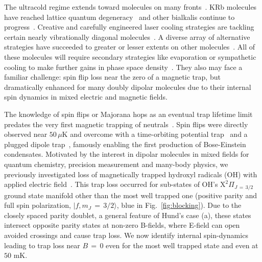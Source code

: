 \documentclass[%
 reprint,
 amsmath,amssymb,
 aps,
prl,
]{revtex4-1}
\begin{document}
The ultracold regime extends toward molecules on many fronts~\cite{Carr2009}. 
KRb molecules have reached lattice quantum degeneracy~\cite{Moses2015} and other bialkalis continue to progress~\cite{Takekoshi2014, Park2015,Guo2016,Liu2017}. 
Creative and carefully engineered laser cooling strategies are tackling certain nearly vibrationally diagonal molecules~\cite{Stuhl2008,Shuman2010,Hummon2013, Barry2014, Zhelyazkova2014, Steinecker2016, Hemmerling2016}. 
A diverse array of alternative strategies have succeeded to greater or lesser extents on other molecules~\cite{Doyle1998, Bethlem1999, Bochinski2003, Narevicius2008, Wiederkehr2012, Prehn2016,Liu2017a}. 
All of these molecules will require secondary strategies like evaporation or sympathetic cooling to make further gains in phase space density~\cite{Parazzoli2011, Stuhl2012evap, Quemener2016}. 
They also may face a familiar challenge: spin flip loss near the zero of a magnetic trap, but dramatically enhanced for many doubly dipolar molecules due to their internal spin dynamics in mixed electric and magnetic fields. 

The knowledge of spin flips or Majorana hops as an eventual trap lifetime limit predates the very first magnetic trapping of neutrals~\cite{Migdall1985}. 
Spin flips were directly observed near $50\,\mu\text{K}$ and overcome with a time-orbiting potential trap~\cite{Petrich1995} and a plugged dipole trap~\cite{Davis1995}, famously enabling the first production of Bose-Einstein condensates.
Motivated by the interest in dipolar molecules in mixed fields for quantum chemistry, precision measurement and many-body physics, we previously investigated loss of magnetically trapped hydroxyl radicals (OH) with applied electric field~\cite{Stuhl2012uwave}. 
This trap loss occurred for sub-states of OH's $\mathrm{X}^2\Pi_{J\,{=}\,3/2}$ ground state manifold other than the most well trapped one (positive parity and full spin polarization, $|f,m_J\,{=}\,3/2\rangle$, blue in Fig.~\ref{fig:blocking}). 
Due to the closely spaced parity doublet, a general feature of Hund's case (a), these states intersect opposite parity states at non-zero B-fields, where E-field can open avoided crossings and cause trap loss.
We now identify internal spin-dynamics leading to trap loss near $B\,{=}\,0$ even for the most well trapped state and even at $50\text{ mK}$.
\end{document}
